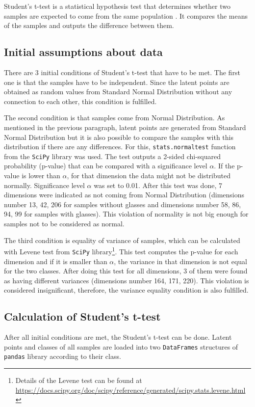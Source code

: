 Student's t-test is a statistical hypothesis test that determines whether two samples are expected to come from the same population \cite{encyclopediaOfMathematics}. It compares the means of the samples and outputs the difference between them.

\subsection*{\label{sec:analysis-assumptions}Initial assumptions about data}
There are 3 initial conditions of Student's t-test that have to be met. The first one is that the samples have to be independent. Since the latent points are obtained as random values from Standard Normal Distribution without any connection to each other, this condition is fulfilled.

The second condition is that samples come from Normal Distribution. As mentioned in the previous paragraph, latent points are generated from Standard Normal Distribution but it is also possible to compare the samples with this distribution if there are any differences. For this, \texttt{stats.normaltest} function from the \texttt{SciPy} library was used. The test outputs a 2-sided chi-squared probability (p-value) that can be compared with a significance level $\alpha$. If the p-value is lower than $\alpha$, for that dimension the data might not be distributed normally. Significance level $\alpha$ was set to 0.01. After this test was done, 7 dimensions were indicated as not coming from Normal Distribution (dimensions number 13, 42, 206 for samples without glasses and dimensions number 58, 86, 94, 99 for samples with glasses). This violation of normality is not big enough for samples not to be considered as normal.

The third condition is equality of variance of samples, which can be calculated with Levene test from \texttt{SciPy} library\footnote{Details of the Levene test can be found at \url{https://docs.scipy.org/doc/scipy/reference/generated/scipy.stats.levene.html}}. This test computes the p-value for each dimension and if it is smaller than $\alpha$, the variance in that dimension is not equal for the two classes. After doing this test for all dimensions, 3 of them were found as having different variances (dimensions number 164, 171, 220). This violation is considered insignificant, therefore, the variance equality condition is also fulfilled.

\subsection*{Calculation of Student's t-test}
After all initial conditions are met, the Student's t-test can be done. Latent points and classes of all samples are loaded into two \texttt{DataFrames} structures of \texttt{pandas} library according to their class.

